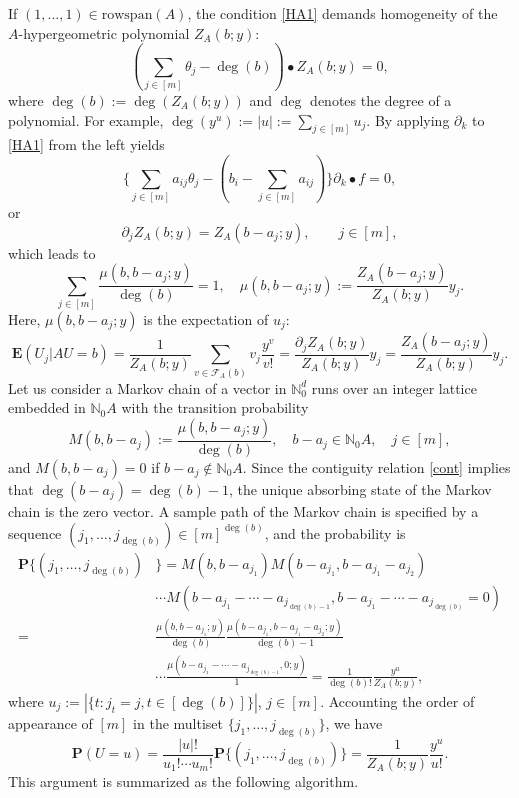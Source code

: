 \documentclass[a4paper,12pt]{article}
\theoremstyle{plain}
\theoremstyle{remark}
\begin{document}
If $(1,\ldots,1)\in\text{rowspan}(A)$, the condition
\eqref{HA1} demands homogeneity of the $A$-hypergeometric
polynomial $Z_A(b;y)$:
\[
  (\sum_{j\in[m]} \theta_j-\deg(b))
  \bullet Z_A(b;y)=0,
\]
where $\deg(b):=\deg(Z_A(b;y))$
and $\deg$ denotes the degree of a polynomial. For example,
$\deg(y^u):=|u|:=\sum_{j\in[m]}u_j$.
By applying $\partial_k$ to
\eqref{HA1} from the left yields
\[
  \{\sum_{j\in[m]}a_{ij}\theta_j-(b_i-\sum_{j\in[m]}a_{ij})\}
  \partial_k \bullet f=0,
\]
or
\begin{equation}
  \partial_j Z_A(b;y)= Z_A(b-a_j;y), \qquad j\in[m],
  \label{cont}
\end{equation}
which leads to
\[
  \sum_{j\in[m]}\frac{\mu(b,b-a_j;y)}{\deg(b)}=1,
  \quad
  \mu(b,b-a_j;y):=\frac{Z_A(b-a_j;y)}{Z_A(b;y)}y_j.
\]
Here, $\mu(b,b-a_j;y)$ is the expectation of $u_j$:
\[
  \mathbf{E}(U_j|AU=b)=\frac{1}{Z_A(b;y)}
  \sum_{v\in\mathcal{F}_A(b)} v_j\frac{y^v}{v!}
  =\frac{\partial_j Z_A(b;y)}{Z_A(b;y)}y_j=
  \frac{Z_A(b-a_j;y)}{Z_A(b;y)}y_j.
\]
Let us consider a Markov chain of a vector in $\mathbb{N}_0^d$
runs over an integer lattice embedded in $\mathbb{N}_0 A$ with
the transition probability
\begin{equation}\label{kernel}
  M(b,b-a_j):=\frac{\mu(b,b-a_j;y)}{\deg(b)},
  \quad b-a_j\in\mathbb{N}_0 A, \quad j\in[m],
\end{equation}
and $M(b,b-a_j)=0$ if $b-a_j\notin\mathbb{N}_0 A$.
Since the contiguity relation \eqref{cont} implies that
$\deg(b-a_j)=\deg(b)-1$, the unique absorbing state of the Markov
chain is the zero vector. A sample path of the Markov chain is
specified by a sequence $(j_1,\ldots,j_{\deg(b)})\in [m]^{\deg(b)}$,
and the probability is 
\begin{align*}
  \mathbf{P}\{(j_1,\ldots,j_{\deg(b)})&\}=
  M(b,b-a_{j_1})M(b-a_{j_1},b-a_{j_1}-a_{j_2})\\
  &\cdots M(b-a_{j_1}-\cdots-a_{j_{\deg(b)-1}},
    b-a_{j_1}-\cdots-a_{j_{\deg(b)}}=0)\\
  =&\frac{\mu(b,b-a_{j_1};y)}{\deg(b)}
    \frac{\mu(b-a_{j_1},b-a_{j_1}-a_{j_2};y)}{\deg(b)-1}\\
  &\cdots\frac{\mu(b-a_{j_1}-\cdots-a_{j_{\deg(b)-1}},0;y)}{1}
  =\frac{1}{\deg(b)!}\frac{y^u}{Z_A(b;y)},
\end{align*}
where $u_j:=|\{t:j_t=j,t\in[\deg(b)]\}|$, $j\in[m]$. Accounting
the order of appearance of $[m]$ in the multiset
$\{j_1,\ldots,j_{\deg(b)}\}$, we have
\[
  \mathbf{P}(U=u)=\frac{|u|!}{u_1!\cdots u_m!}
  \mathbf{P}\{(j_1,\ldots,j_{\deg(b)})\}
  =\frac{1}{Z_A(b;y)}\frac{y^u}{u!}.
\]
This argument is summarized as the following algorithm.
\end{document}
